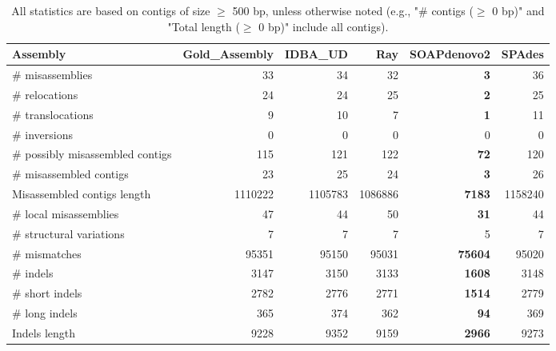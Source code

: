 \documentclass[12pt,a4paper]{article}
\begin{document}
\begin{table}[ht]
\begin{center}
\caption{All statistics are based on contigs of size $\geq$ 500 bp, unless otherwise noted (e.g., "\# contigs ($\geq$ 0 bp)" and "Total length ($\geq$ 0 bp)" include all contigs).}
\begin{tabular}{|l*{5}{|r}|}
\hline
Assembly & Gold\_Assembly & IDBA\_UD & Ray & SOAPdenovo2 & SPAdes \\ \hline
\# misassemblies & 33 & 34 & 32 & {\bf 3} & 36 \\ \hline
\hspace{5mm}\# relocations & 24 & 24 & 25 & {\bf 2} & 25 \\ \hline
\hspace{5mm}\# translocations & 9 & 10 & 7 & {\bf 1} & 11 \\ \hline
\hspace{5mm}\# inversions & 0 & 0 & 0 & 0 & 0 \\ \hline
\# possibly misassembled contigs & 115 & 121 & 122 & {\bf 72} & 120 \\ \hline
\# misassembled contigs & 23 & 25 & 24 & {\bf 3} & 26 \\ \hline
Misassembled contigs length & 1110222 & 1105783 & 1086886 & {\bf 7183} & 1158240 \\ \hline
\# local misassemblies & 47 & 44 & 50 & {\bf 31} & 44 \\ \hline
\# structural variations & 7 & 7 & 7 & 5 & 7 \\ \hline
\# mismatches & 95351 & 95150 & 95031 & {\bf 75604} & 95020 \\ \hline
\# indels & 3147 & 3150 & 3133 & {\bf 1608} & 3148 \\ \hline
\hspace{5mm}\# short indels & 2782 & 2776 & 2771 & {\bf 1514} & 2779 \\ \hline
\hspace{5mm}\# long indels & 365 & 374 & 362 & {\bf 94} & 369 \\ \hline
Indels length & 9228 & 9352 & 9159 & {\bf 2966} & 9273 \\ \hline
\end{tabular}
\end{center}
\end{table}
\end{document}
